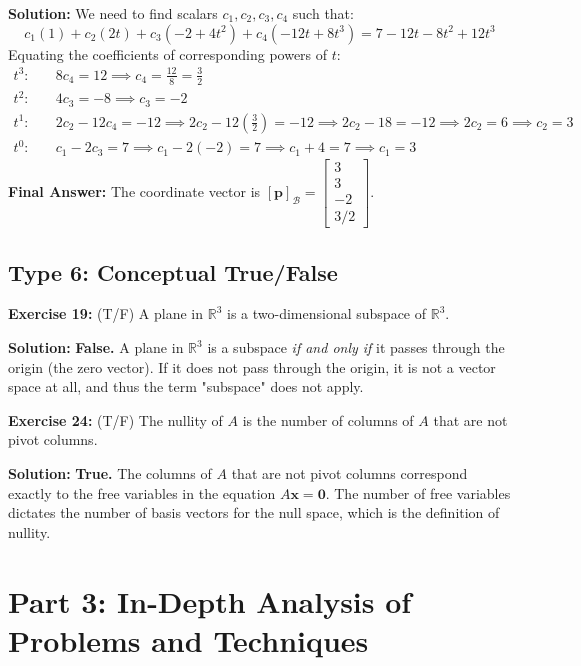 \documentclass[12pt]{article}
\begin{document}
\textbf{Solution:}
We need to find scalars $c_1, c_2, c_3, c_4$ such that:
\[ c_1(1) + c_2(2t) + c_3(-2+4t^2) + c_4(-12t+8t^3) = 7 - 12t - 8t^2 + 12t^3 \]
Equating the coefficients of corresponding powers of $t$:
\begin{align*}
    t^3: \quad & 8c_4 = 12 \implies c_4 = \frac{12}{8} = \frac{3}{2} \\
    t^2: \quad & 4c_3 = -8 \implies c_3 = -2 \\
    t^1: \quad & 2c_2 - 12c_4 = -12 \implies 2c_2 - 12\left(\frac{3}{2}\right) = -12 \implies 2c_2 - 18 = -12 \implies 2c_2 = 6 \implies c_2 = 3 \\
    t^0: \quad & c_1 - 2c_3 = 7 \implies c_1 - 2(-2) = 7 \implies c_1 + 4 = 7 \implies c_1 = 3
\end{align*}
\textbf{Final Answer:} The coordinate vector is $[\mathbf{p}]_{\mathcal{B}} = \begin{bmatrix} 3 \\ 3 \\ -2 \\ 3/2 \end{bmatrix}$.

\subsection{Type 6: Conceptual True/False}

\textbf{Exercise 19:} (T/F) A plane in $\mathbb{R}^3$ is a two-dimensional subspace of $\mathbb{R}^3$.

\textbf{Solution:}
\textbf{False.} A plane in $\mathbb{R}^3$ is a subspace \textit{if and only if} it passes through the origin (the zero vector). If it does not pass through the origin, it is not a vector space at all, and thus the term "subspace" does not apply.

\vspace{0.5cm}
\textbf{Exercise 24:} (T/F) The nullity of $A$ is the number of columns of $A$ that are not pivot columns.

\textbf{Solution:}
\textbf{True.} The columns of $A$ that are not pivot columns correspond exactly to the free variables in the equation $A\mathbf{x} = \mathbf{0}$. The number of free variables dictates the number of basis vectors for the null space, which is the definition of nullity.

\newpage
\section{Part 3: In-Depth Analysis of Problems and Techniques}
\end{document}
